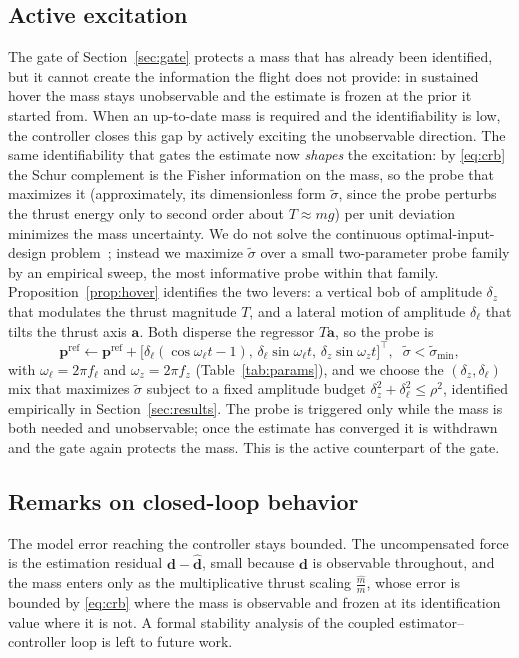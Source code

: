 \documentclass{ieeeaccess}
\newcommand{\vect}[1]{\bm{#1}}
\begin{document}
\subsection{Active excitation}\label{sec:active}
The gate of Section~\ref{sec:gate} protects a mass that has already been
identified, but it cannot create the information the flight does not provide:
in sustained hover the mass stays unobservable and the estimate is frozen at
the prior it started from. When an up-to-date mass is required and the
identifiability is low, the controller closes this gap by actively exciting the
unobservable direction. The same identifiability that gates the estimate now
\emph{shapes} the excitation: by \eqref{eq:crb} the Schur complement is the Fisher
information on the mass, so the probe that maximizes it (approximately, its
dimensionless form $\tilde\sigma$, since the probe perturbs the thrust energy
only to second order about $T\approx mg$) per unit deviation
minimizes the mass uncertainty. We do not solve the continuous
optimal-input-design problem~\cite{mehra1974optimal}; instead we maximize
$\tilde\sigma$ over a small two-parameter probe family by an empirical sweep, the
most informative probe within that family. Proposition~\ref{prop:hover}
identifies the two levers: a vertical bob of amplitude $\delta_z$ that modulates the
thrust magnitude $T$, and a lateral motion of amplitude $\delta_\ell$ that tilts the
thrust axis $\vect{a}$. Both disperse the regressor $T\vect{a}$, so the probe is
\begin{equation}
\vect{p}^{\text{ref}}\!\leftarrow\!\vect{p}^{\text{ref}}\!+\!
\big[\delta_\ell(\cos\omega_\ell t\!-\!1),\,\delta_\ell\sin\omega_\ell t,\,\delta_z\sin\omega_z t\big]^{\!\top},
\;\; \tilde\sigma<\tilde\sigma_{\min},
\label{eq:probe}
\end{equation}
with $\omega_\ell=2\pi f_\ell$ and $\omega_z=2\pi f_z$ (Table~\ref{tab:params}),
and we choose the $(\delta_z,\delta_\ell)$ mix that maximizes $\tilde\sigma$ subject to a
fixed amplitude budget $\delta_z^2+\delta_\ell^2\le\rho^2$, identified empirically in
Section~\ref{sec:results}. The
probe is triggered only while the mass is both needed and unobservable; once the
estimate has converged it is withdrawn and the gate again protects the mass. This
is the active counterpart of the gate.

\subsection{Remarks on closed-loop behavior}
The model error reaching the controller stays bounded. The uncompensated force is
the estimation residual $\vect{d}-\hat{\vect{d}}$, small because $\vect{d}$ is
observable throughout, and the mass enters only as the multiplicative thrust
scaling $\tfrac{\hat m}{m}$, whose error is bounded by \eqref{eq:crb} where the mass is
observable and frozen at its identification value where it is not. A formal
stability analysis of the coupled estimator--controller loop is left to future
work.
\end{document}
